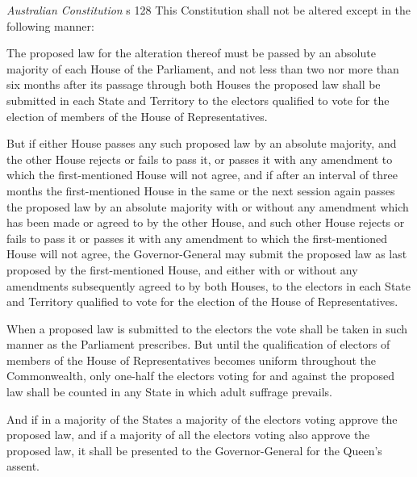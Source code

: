 \begin{statutedetails}{\textit{Australian Constitution} s 128}
    \flushleft
    This Constitution shall not be altered except in the following manner:

    \vspace{\baselineskip}

    The proposed law for the alteration thereof must be passed by an absolute majority of each House of the Parliament, and not less than two nor more than six months after its passage through both Houses the proposed law shall be submitted in each State and Territory to the electors qualified to vote for the election of members of the House of Representatives.

    \vspace{\baselineskip}

    But if either House passes any such proposed law by an absolute majority, and the other House rejects or fails to pass it, or passes it with any amendment to which the first-mentioned House will not agree, and if after an interval of three months the first-mentioned House in the same or the next session again passes the proposed law by an absolute majority with or without any amendment which has been made or agreed to by the other House, and such other House rejects or fails to pass it or passes it with any amendment to which the first-mentioned House will not agree, the Governor-General may submit the proposed law as last proposed by the first-mentioned House, and either with or without any amendments subsequently agreed to by both Houses, to the electors in each State and Territory qualified to vote for the election of the House of Representatives.

    \vspace{\baselineskip}

    When a proposed law is submitted to the electors the vote shall be taken in such manner as the Parliament prescribes. But until the qualification of electors of members of the House of Representatives becomes uniform throughout the Commonwealth, only one-half the electors voting for and against the proposed law shall be counted in any State in which adult suffrage prevails.

    \vspace{\baselineskip}

    And if in a majority of the States a majority of the electors voting approve the proposed law, and if a majority of all the electors voting also approve the proposed law, it shall be presented to the Governor-General for the Queen's assent.


\end{statutedetails}
